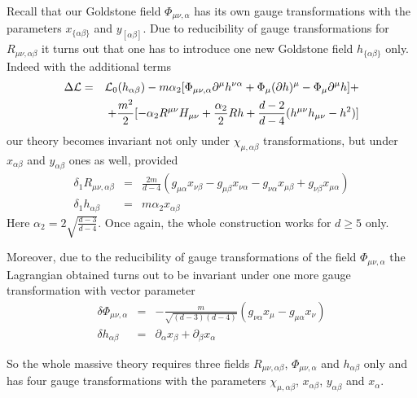 \documentclass[a4paper,12pt]{article}
\begin{document}
Recall that our Goldstone field $\Phi_{\mu\nu,\alpha}$ has its own
gauge transformations with the parameters $x_{\{\alpha\beta\}}$ and
$y_{[\alpha\beta]}$. Due to reducibility of gauge transformations
for $R_{\mu\nu,\alpha\beta}$ it turns out that one has to introduce
one new Goldstone field $h_{\{\alpha\beta\}}$ only. Indeed with the
additional terms
\begin{eqnarray}
\Delta {\cal L} &=& {\cal L}_0 (h_{\alpha\beta}) - m \alpha_2 [
\Phi_{\mu\nu,\alpha} \partial^\mu h^{\nu\alpha} + \Phi_\mu
(\partial h)^\mu - \Phi_\mu \partial^\mu h ] + \nonumber \\
 && + \frac{m^2}{2} [ - \alpha_2 R^{\mu\nu} H_{\mu\nu} +
\frac{\alpha_2}{2} R h + \frac{d-2}{d-4} (h^{\mu\nu} h_{\mu\nu}
- h^2) ]
\end{eqnarray}
our theory becomes invariant not only under $\chi_{\mu,\alpha\beta}$
transformations, but under $x_{\alpha\beta}$ and $y_{\alpha\beta}$
ones as well, provided
\begin{eqnarray}
\delta_1 R_{\mu\nu,\alpha\beta} &=& \frac{2m}{d-4} ( g_{\mu\alpha}
x_{\nu\beta} - g_{\mu\beta} x_{\nu\alpha} - g_{\nu\alpha} x_{\mu\beta}
+ g_{\nu\beta} x_{\mu\alpha} ) \nonumber \\
\delta_1 h_{\alpha\beta} &=& m \alpha_2 x_{\alpha\beta}
\end{eqnarray}
Here $\alpha_2 = 2 \sqrt{\frac{d-3}{d-4}}$. Once again, the whole
construction works for $d \ge 5$ only.

Moreover, due to the reducibility of gauge transformations of the
field $\Phi_{\mu\nu,\alpha}$ the Lagrangian obtained turns out to be
invariant under one more gauge transformation with vector parameter
\begin{eqnarray}
\delta \Phi_{\mu\nu,\alpha} &=& - \frac{m}{\sqrt{(d-3)(d-4)}} (g_{\nu\alpha}
x_\mu - g_{\mu\alpha} x_\nu) \nonumber \\
\delta h_{\alpha\beta} &=& \partial_\alpha x_\beta + \partial_\beta
x_\alpha
\end{eqnarray}

So the whole massive theory requires three fields $R_{\mu\nu,\alpha\beta}$,
$\Phi_{\mu\nu,\alpha}$ and $h_{\alpha\beta}$ only and has four gauge
transformations with the parameters $\chi_{\mu,\alpha\beta}$,
$x_{\alpha\beta}$, $y_{\alpha\beta}$ and $x_\alpha$.
\end{document}
